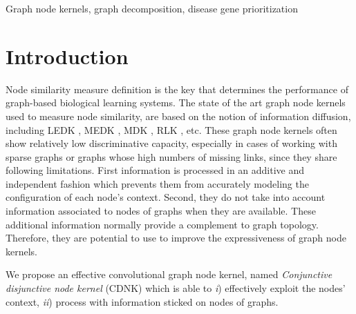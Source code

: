 \documentclass[review]{elsarticle}
\begin{document}
\begin{frontmatter}
\begin{keyword}
Graph node kernels, graph decomposition, disease gene prioritization
\end{keyword}
\end{frontmatter}

\linenumbers
\section{Introduction}
Node similarity measure definition is the key that determines the performance of graph-based biological learning systems. The state of the art graph node kernels used to measure node similarity, are based on the notion of information diffusion, including LEDK \cite{kondor2002diffusion}, MEDK \cite{chen2014disease}, MDK \cite{fouss2006experimental}, RLK \cite{chebotarev2006matrix}, etc. These graph node kernels often show relatively low discriminative capacity, especially in cases of working with sparse graphs or graphs whose high numbers of missing links, since they share following limitations. First information is processed in an additive and independent fashion which prevents them from accurately modeling the configuration of each node's context. Second, they do not take into account information associated to nodes of graphs when they are available. These additional information normally provide a complement to graph topology. Therefore, they are potential to use to improve the expressiveness of graph node kernels.

We propose an effective convolutional graph node kernel, named \textit{Conjunctive disjunctive node kernel} (CDNK) which is able to \textit{i}) effectively exploit the nodes' context, \textit{ii}) process with information sticked on nodes of graphs.
\end{document}
